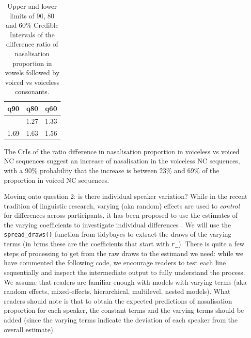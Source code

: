 \documentclass[
  authoryear,
  preprint,
  3p]{elsarticle}
\begin{document}
\begin{longtable}[]{@{}rrr@{}}

\caption{\label{tbl-nas-prop-bm-diff-quant}Upper and lower limits of 90,
80 and 60\% Credible Intervals of the difference ratio of nasalisation
proportion in vowels followed by voiced vs voiceless consonants.}

\tabularnewline

\toprule\noalign{}
q90 & q80 & q60 \\
\midrule\noalign{}
\endhead
\bottomrule\noalign{}
\endlastfoot
1.23 & 1.27 & 1.33 \\
1.69 & 1.63 & 1.56 \\

\end{longtable}

The CrIs of the ratio difference in nasalisation proportion in voiceless
vs voiced NC sequences suggest an increase of nasalisation in the
voiceless NC sequences, with a 90\% probability that the increase is
between 23\% and 69\% of the proportion in voiced NC sequences.

Moving onto question 2: is there individual speaker variation? While in
the recent tradition of linguistic research, varying (aka random)
effects are used to \emph{control} for differences across participants,
it has been proposed to use the estimates of the varying coefficients to
investigate individual differences \citep{tamminga2016}. We will use the
\texttt{spread\_draws()} function from tidybayes \citep{kay2019} to
extract the draws of the varying terms (in brms these are the
coefficients that start with \texttt{r\_}). There is quite a few steps
of processing to get from the raw draws to the estimand we need: while
we have commented the following code, we encourage readers to test each
line sequentially and inspect the intermediate output to fully
understand the process. We assume that readers are familiar enough with
models with varying terms (aka random effects, mixed-effects,
hierarchical, multilevel, nested models). What readers should note is
that to obtain the expected predictions of nasalisation proportion for
each speaker, the constant terms and the varying terms should be added
(since the varying terms indicate the deviation of each speaker from the
overall estimate).
\end{document}
